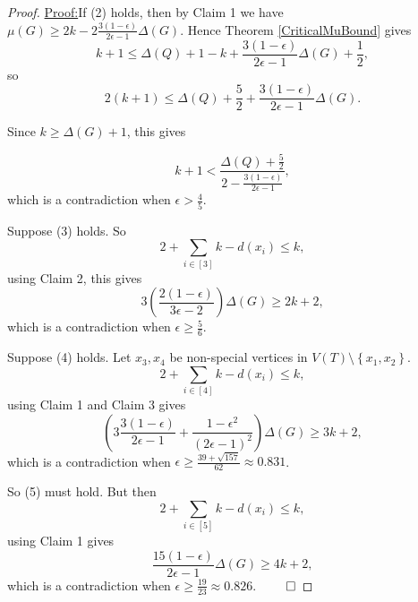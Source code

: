 \documentclass[12pt]{amsart}
\theoremstyle{plain}
\theoremstyle{definition}
\theoremstyle{remark}
\newcommand{\set}[1]{\left\{ #1 \right\}}
\newcommand{\irange}[1]{\left[#1\right]}
\newcommand{\parens}[1]{\left( #1 \right)}
\newenvironment{claimproof}[1]{\par\noindent\underline{Proof:}\space#1}{\leavevmode\unskip\penalty9999
\hbox{}\nobreak\hfill\quad\hbox{$\qed$}}
\begin{document}
\begin{proof}
\begin{claimproof}
If (2) holds, then by Claim 1 we have $\mu(G) \ge 2k - 2\frac{3(1-\epsilon)}{2\epsilon -1}\Delta(G)$.  Hence Theorem \ref{CriticalMuBound} gives
\[k + 1 \le \Delta(Q) + 1 - k + \frac{3(1-\epsilon)}{2\epsilon -1}\Delta(G) + \frac12,\]
so
\[2(k + 1) \le \Delta(Q) + \frac52 + \frac{3(1-\epsilon)}{2\epsilon -1}\Delta(G).\]

Since $k \ge \Delta(G) + 1$, this gives

\[k + 1 < \frac{\Delta(Q) + \frac52}{2 - \frac{3(1-\epsilon)}{2\epsilon -1}},\]
which is a contradiction when $\epsilon > \frac45$.

Suppose (3) holds.  So
\[2 + \sum_{i \in \irange{3}} k - d(x_i) \le k,\]
using Claim 2, this gives
\[3\parens{\frac{2(1-\epsilon)}{3\epsilon - 2}}\Delta(G) \ge 2k+2,\]
which is a contradiction when $\epsilon \ge \frac56$.

Suppose (4) holds.  Let $x_3,x_4$ be non-special vertices in $V(T) \setminus \set{x_1,x_2}$.
\[2 + \sum_{i \in \irange{4}} k - d(x_i) \le k,\]
using Claim 1 and Claim 3 gives
\[\parens{3\frac{3(1-\epsilon)}{2\epsilon -1} + \frac{1 - \epsilon^2}{\parens{2\epsilon - 1}^2}}\Delta(G) \ge 3k+2,\]
which is a contradiction when $\epsilon \ge \frac{39 + \sqrt{157}}{62} \approx 0.831$.

So (5) must hold.  But then
\[2 + \sum_{i \in \irange{5}} k - d(x_i) \le k,\]
using Claim 1 gives
\[\frac{15(1-\epsilon)}{2\epsilon -1}\Delta(G) \ge 4k+2,\]
which is a contradiction when $\epsilon \ge \frac{19}{23} \approx 0.826$.
\end{claimproof}

\end{proof}

\newpage
\end{document}
